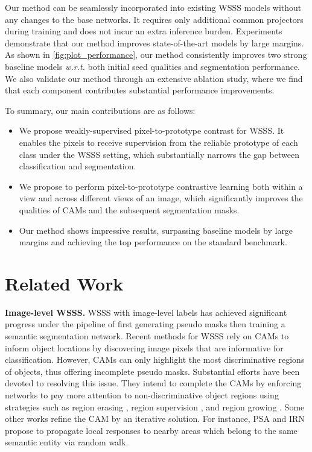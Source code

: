 \documentclass[10pt,twocolumn,letterpaper]{article}
\begin{document}
Our method can be seamlessly incorporated into existing WSSS models without any changes to the base networks.
It requires only additional common projectors during training and does not incur an extra inference burden.
Experiments demonstrate that our method improves state-of-the-art models by large margins.
As shown in \cref{fig:plot_performance}, our method consistently improves two strong baseline models \textit{w.r.t.} both initial seed qualities and segmentation performance.
We also validate our method through an extensive ablation study, where we find that each component contributes substantial performance improvements.

To summary, our main contributions are as follows: 
\begin{itemize}
\item We propose weakly-supervised pixel-to-prototype contrast for WSSS. It enables the pixels to receive supervision from the reliable prototype of each class under the WSSS setting, which substantially narrows the gap between classification and segmentation. 
\item We propose to perform pixel-to-prototype contrastive learning both within a view and across different views of an image, which significantly improves the qualities of CAMs and the subsequent segmentation masks. 
\item Our method shows impressive results, surpassing baseline models by large margins and achieving the top performance on the standard benchmark.
\end{itemize}



 \section{Related Work}
\noindent \textbf{Image-level WSSS.}
WSSS with image-level labels has achieved significant progress under the pipeline of first generating pseudo masks then training a semantic segmentation network.
Recent methods for WSSS rely on CAMs \cite{zhou2016learningCAM} to inform object locations by discovering image pixels that are informative for classification.
However, CAMs can only highlight the most discriminative regions of objects, thus offering incomplete pseudo masks.
Substantial efforts have been devoted to resolving this issue.
They intend to complete the CAMs by enforcing networks to pay more attention to non-discriminative object regions using strategies such as region erasing \cite{hou2018selfErasing, wei2017objectERASING}, region supervision \cite{kim2021discriminativeDRS}, and region growing \cite{huang2018weaklyRegionGrowing, shimoda2019self-supervised-difference}.
Some other works refine the CAM by an iterative solution.
For instance, PSA \cite{ahn2018learningAffinityNet} and IRN \cite{ahn2019weaklyIRNet} propose to propagate local responses to nearby areas which belong to the same semantic entity via random walk.
\end{document}
